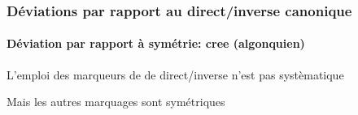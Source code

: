 \begin{frame}
\frametitle{Déviations par rapport au direct/inverse canonique}
\framesubtitle{Déviation par rapport à symétrie: cree (algonquien)}
\begin{smallwideitemize}
\item L'emploi des marqueurs de de direct/inverse n'est pas systèmatique
\item Mais les autres marquages sont symétriques
\end{smallwideitemize}
\begin{table}[h]
\caption{Plains Cree present paradigms. TA  ``see" and IA ``run" (\cite{wolfart73})}\label{tab:cree.tr} \centering
{}
\end{table}
\end{frame}
